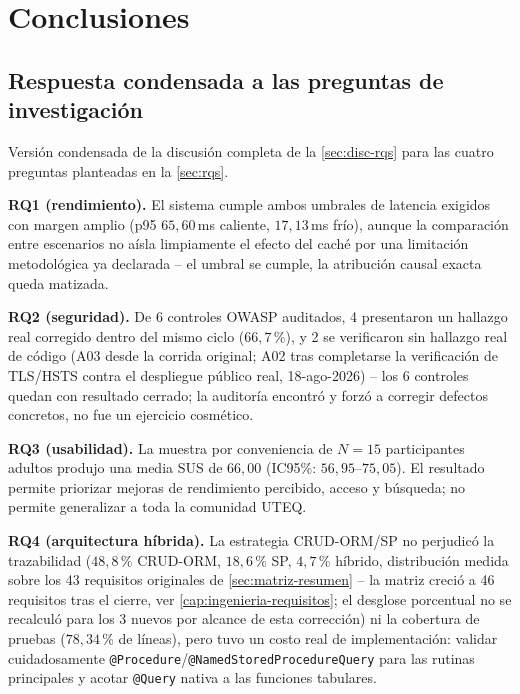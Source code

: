 \chapter{Conclusiones}

\section{Respuesta condensada a las preguntas de investigación}

Versión condensada de la discusión completa de la
\autoref{sec:disc-rqs} para las cuatro preguntas planteadas en la
\autoref{sec:rqs}.

\textbf{RQ1 (rendimiento).} El sistema cumple ambos umbrales de latencia
exigidos con margen amplio (p95 $65{,}60$\,ms caliente,
$17{,}13$\,ms frío), aunque la comparación entre escenarios no aísla
limpiamente el efecto del caché por una limitación metodológica ya
declarada -- el umbral se cumple, la atribución causal exacta queda
matizada.

\textbf{RQ2 (seguridad).} De 6 controles OWASP auditados, 4 presentaron
un hallazgo real corregido dentro del mismo ciclo ($66{,}7$\,\%), y 2 se
verificaron sin hallazgo real de código (A03 desde la corrida original;
A02 tras completarse la verificación de TLS/HSTS contra el despliegue
público real, 18-ago-2026) -- los 6 controles quedan con resultado
cerrado; la auditoría encontró y forzó a corregir defectos concretos, no
fue un ejercicio cosmético.

\textbf{RQ3 (usabilidad).} La muestra por conveniencia de $N=15$
participantes adultos produjo una media SUS de $66{,}00$ (IC95\%:
$56{,}95$--$75{,}05$). El resultado permite priorizar mejoras de
rendimiento percibido, acceso y búsqueda; no permite generalizar a toda la
comunidad UTEQ.

\textbf{RQ4 (arquitectura híbrida).} La estrategia CRUD-ORM/SP no
perjudicó la trazabilidad ($48{,}8$\,\% CRUD-ORM, $18{,}6$\,\% SP,
$4{,}7$\,\% híbrido, distribución medida sobre los 43 requisitos
originales de \autoref{sec:matriz-resumen} -- la matriz creció a 46
requisitos tras el cierre, ver \autoref{cap:ingenieria-requisitos}; el
desglose porcentual no se recalculó para los 3 nuevos por alcance de
esta corrección) ni la cobertura de pruebas ($78{,}34$\,\% de líneas),
pero tuvo un costo real de implementación: validar cuidadosamente
\texttt{@Procedure}/\texttt{@NamedStoredProcedureQuery} para las rutinas
principales y acotar \texttt{@Query} nativa a las funciones tabulares.

